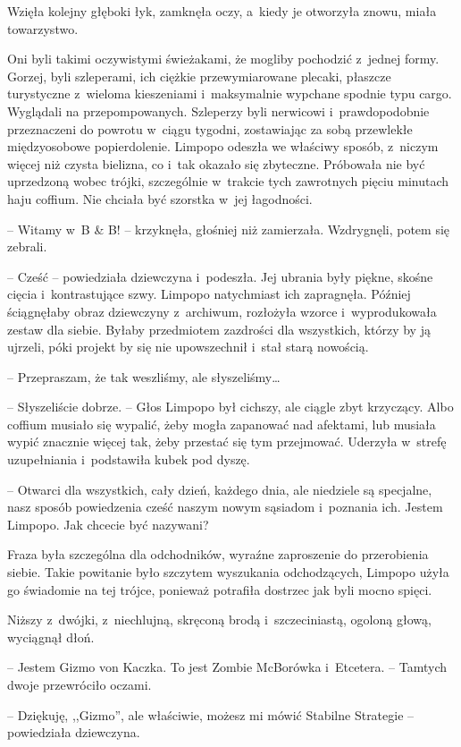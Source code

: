 \documentclass[oneside,polish,11pt,sfheadings]{mwbk}
\begin{document}
Wzięła kolejny głęboki łyk, zamknęła oczy, a~kiedy je otworzyła znowu,
miała towarzystwo.

Oni byli takimi oczywistymi świeżakami, że mogliby pochodzić z~jednej
formy. Gorzej, byli szleperami, ich ciężkie przewymiarowane plecaki,
płaszcze turystyczne z~wieloma kieszeniami i~maksymalnie wypchane
spodnie typu cargo. Wyglądali na przepompowanych. Szleperzy byli
nerwicowi i~prawdopodobnie przeznaczeni do powrotu w~ciągu tygodni,
zostawiając za sobą przewlekłe międzyosobowe popierdolenie. Limpopo
odeszła we właściwy sposób, z~niczym więcej niż czysta bielizna, co i~tak okazało się zbyteczne. Próbowała nie być uprzedzoną wobec trójki,
szczególnie w~trakcie tych zawrotnych pięciu minutach haju coffium. Nie
chciała być szorstka w~jej łagodności.

-- Witamy w~B \& B! -- krzyknęła, głośniej niż zamierzała. Wzdrygnęli,
potem się zebrali.

-- Cześć -- powiedziała dziewczyna i~podeszła. Jej ubrania były piękne,
skośne cięcia i~kontrastujące szwy. Limpopo natychmiast ich zapragnęła.
Później ściągnęłaby obraz dziewczyny z~archiwum, rozłożyła wzorce i~wyprodukowała zestaw dla siebie. Byłaby przedmiotem zazdrości dla
wszystkich, którzy by ją ujrzeli, póki projekt by się nie upowszechnił i~stał starą nowością. 

-- Przepraszam, że tak weszliśmy, ale słyszeliśmy\ldots 

-- Słyszeliście dobrze. -- Głos Limpopo był cichszy, ale ciągle zbyt
krzyczący. Albo coffium musiało się wypalić, żeby mogła zapanować nad
afektami, lub musiała wypić znacznie więcej tak, żeby przestać się tym
przejmować. Uderzyła w~strefę uzupełniania i~podstawiła kubek pod dyszę.

-- Otwarci dla wszystkich, cały dzień, każdego dnia, ale niedziele są
specjalne, nasz sposób powiedzenia cześć naszym nowym sąsiadom i~poznania ich. Jestem Limpopo. Jak chcecie być nazywani?

Fraza była szczególna dla odchodników, wyraźne zaproszenie do
przerobienia siebie. Takie powitanie było szczytem wyszukania
odchodzących, Limpopo użyła go świadomie na tej trójce, ponieważ
potrafiła dostrzec jak byli mocno spięci.

Niższy z~dwójki, z~niechlujną, skręconą brodą i~szczeciniastą, ogoloną
głową, wyciągnął dłoń. 

-- Jestem Gizmo von Kaczka. To jest Zombie
McBorówka i~Etcetera. -- Tamtych dwoje przewróciło oczami.

-- Dziękuję, ,,Gizmo'', ale właściwie, możesz mi mówić Stabilne Strategie
-- powiedziała dziewczyna.
\end{document}

